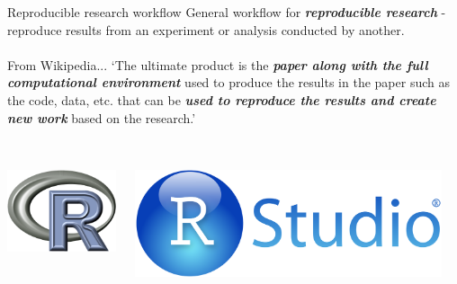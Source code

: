 \documentclass[serif]{beamer}\usepackage[]{graphicx}\usepackage[]{color}
\newcommand{\emtxt}[1]{\textbf{\textit{#1}}}
\begin{document}
\begin{frame}{Reproducible research workflow}
General workflow for \emtxt{reproducible research} - reproduce results from an experiment or analysis conducted by another.\\~\\
From Wikipedia... `The ultimate product is the \emtxt{paper along with the full computational environment} used to produce the results in the paper such as the code, data, etc. that can be \emtxt{used to reproduce the results and create new work} based on the research.'\\~\\
\begin{columns}
\begin{column}{0.25\textwidth}
\centerline{\includegraphics[width = \textwidth]{fig/Rlogo.png}}
\end{column}
\begin{column}{0.25\textwidth}
\centerline{\includegraphics[width = \textwidth]{fig/RStudio.png}}
\end{column}
\begin{column}{0.25\textwidth}

\end{column}
\end{columns}
\end{frame}
\end{document}
